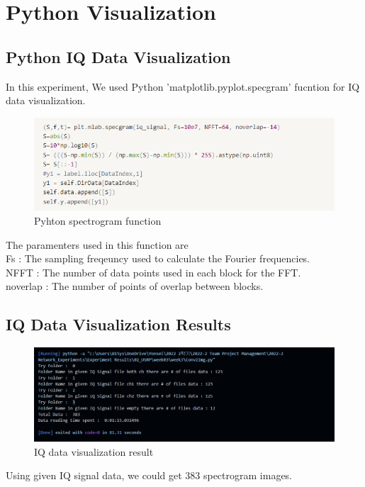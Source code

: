 \section{Python Visualization}
\subsection{Python IQ Data Visualization}

    In this experiment, We used Python 'matplotlib.pyplot.specgram' fucntion for IQ data visualization. \\
    
    \vspace{-4mm}  
    \begin{figure}[!h]\raggedleft
    \hspace{15mm}
		\includegraphics[width=.95\textwidth]{image/week03/1-1-1.png}
		\caption{\footnotesize Pyhton spectrogram function}
		\vspace{-10pt}
    \end{figure}
    
    The paramenters used in this function are \\
    Fs : The sampling freqeuncy used to calculate the Fourier frequencies. \\
    NFFT : The number of data points used in each block for the FFT.\\
    noverlap : The number of points of overlap between blocks.\\
    
    
\subsection{IQ Data Visualization Results}

    \vspace{-4mm}  
    \begin{figure}[!h]\raggedleft
    \hspace{15mm}
		\includegraphics[width=.95\textwidth]{image/week03/1-2-1.png}
		\caption{\footnotesize IQ data visualization result}
		\vspace{-10pt}
    \end{figure}
    Using given IQ signal data, we could get 383 spectrogram images. \\
    
\clearpage